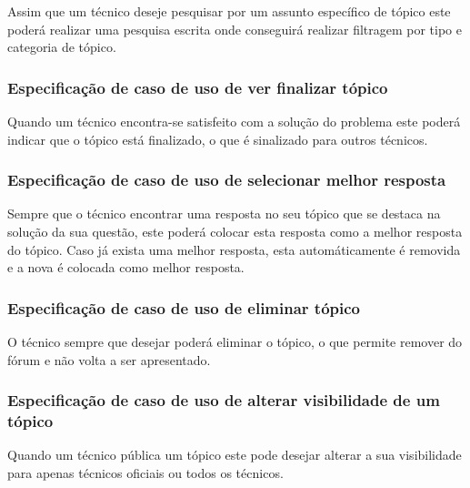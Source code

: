 Assim que um técnico deseje pesquisar por um assunto específico de tópico este poderá realizar uma pesquisa escrita onde conseguirá realizar filtragem por tipo e categoria de tópico.




\subsubsection{Especificação de caso de uso de ver finalizar tópico}

Quando um técnico encontra-se satisfeito com a solução do problema este poderá indicar que o tópico está finalizado, o que é sinalizado para outros técnicos.



\newpage

\subsubsection{Especificação de caso de uso de selecionar melhor resposta}

Sempre que o técnico encontrar uma resposta no seu tópico que se destaca na solução da sua questão, este poderá colocar esta resposta como a melhor resposta do tópico. Caso já exista uma melhor resposta, esta automáticamente é removida e a nova é colocada como melhor resposta.



\newpage

\subsubsection{Especificação de caso de uso de eliminar tópico}

O técnico sempre que desejar poderá eliminar o tópico, o que permite remover do fórum e não volta a ser apresentado.



\subsubsection{Especificação de caso de uso de alterar visibilidade de um tópico}

Quando um técnico pública um tópico este pode desejar alterar a sua visibilidade para apenas técnicos oficiais ou todos os técnicos.

